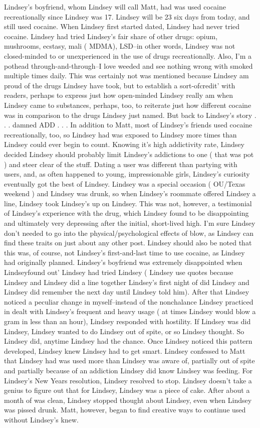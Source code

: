 \documentclass[12pt]{book}
\begin{document}
Lindsey's boyfriend, whom Lindsey will call Matt, had was used cocaine recreationally since Lindsey was 17. Lindsey will be 23 six days from today, and still used cocaine. When Lindsey first started dated, Lindsey had never tried cocaine. Lindsey had tried Lindsey's fair share of other drugs: opium, mushrooms, ecstasy, mali ( MDMA), LSD--in other words, Lindsey was not closed-minded to or unexperienced in the use of drugs recreationally. Also, I'm a pothead through-and-through--I love weeded and see nothing wrong with smoked multiple times daily. This was certainly not was mentioned because Lindsey am proud of the drugs Lindsey have took, but to establish a sort-ofcredit' with readers, perhaps to express just how open-minded Lindsey really am when Lindsey came to substances, perhaps, too, to reiterate just how different cocaine was in comparison to the drugs Lindsey just named. But back to Lindsey's story . . .  damned ADD . . .  In addition to Matt, most of Lindsey's friends used cocaine recreationally, too, so Lindsey had was exposed to Lindsey more times than Lindsey could ever begin to count. Knowing it's high addictivity rate, Lindsey decided Lindsey should probably limit Lindsey's addictions to one ( that was pot ) and steer clear of the stuff. Dating a user was different than partying with users, and, as often happened to young, impressionable girls, Lindsey's curiosity eventually got the best of Lindsey. Lindsey was a special occasion ( OU/Texas weekend ) and Lindsey was drunk, so when Lindsey's roommate offered Lindsey a line, Lindsey took Lindsey's up on Lindsey. This was not, however, a testimonial of Lindsey's experience with the drug, which Lindsey found to be disappointing and ultimately very depressing after the initial, short-lived high. I'm sure Lindsey don't needed to go into the physical/psychological effects of blow, as Lindsey can find these traits on just about any other post. Lindsey should also be noted that this was, of course, not Lindsey's first-and-last time to use cocaine, as Lindsey had originally planned. Lindsey's boyfriend was extremely disappointed when Lindseyfound out' Lindsey had tried Lindsey ( Lindsey use quotes because Lindsey and Lindsey did a line together Lindsey's first night of did Lindsey and Lindsey did remember the next day until Lindsey told him). After that Lindsey noticed a peculiar change in myself--instead of the nonchalance Lindsey practiced in dealt with Lindsey's frequent and heavy usage ( at times Lindsey would blow a gram in less than an hour), Lindsey responded with hostility. If Lindsey was did Lindsey, Lindsey wanted to do Lindsey out of spite, or so Lindsey thought. So Lindsey did, anytime Lindsey had the chance. Once Lindsey noticed this pattern developed, Lindsey knew Lindsey had to get smart. Lindsey confessed to Matt that Lindsey had was used more than Lindsey was aware of, partially out of spite and partially because of an addiction Lindsey did know Lindsey was feeding. For Lindsey's New Years resolution, Lindsey resolved to stop. Lindsey doesn't take a genius to figure out that for Lindsey, Lindsey was a piece of cake. After about a month of was clean, Lindsey stopped thought about Lindsey, even when Lindsey was pissed drunk. Matt, however, began to find creative ways to continue used without Lindsey's knew. 
\end{document}

